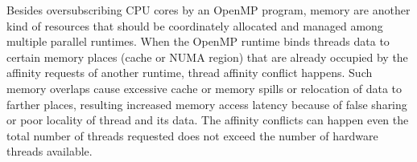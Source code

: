Besides oversubscribing CPU cores by an OpenMP program, 
memory are another kind of resources that should be coordinately allocated and managed among
multiple parallel runtimes. %
When the OpenMP runtime binds threads data to 
certain memory places (cache or NUMA region) that are already occupied by 
the affinity requests of another runtime, thread affinity conflict happens.  
Such memory overlaps cause excessive cache or memory spills or relocation of data
to farther places, resulting increased memory access latency because of false sharing or 
poor locality of thread and its data. %
The affinity conflicts can happen even the total number of threads requested does not exceed the number of hardware threads available.

